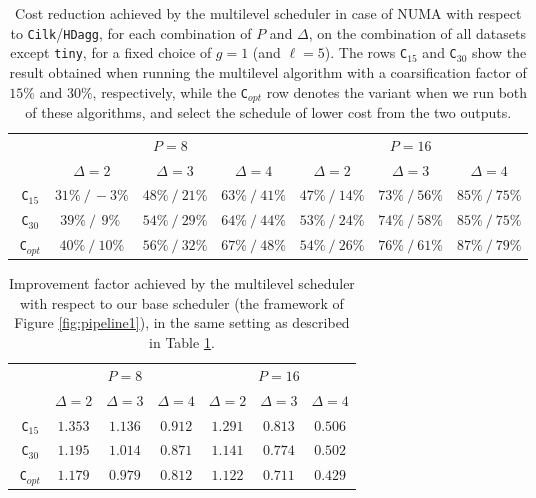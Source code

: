 \documentclass[sigconf,nonacm]{acmart}
\begin{document}
\begin{table*}[t!]
    \centering
      \caption{Cost reduction achieved by the multilevel scheduler in case of NUMA with respect to \texttt{Cilk}/\texttt{HDagg}, for each combination of $P$ and $\Delta$, on the combination of all datasets except \texttt{tiny}, for a fixed choice of $g=1$ (and $\ell=5$). The rows \texttt{C}$_{15}$ and \texttt{C}$_{30}$ show the result obtained when running the multilevel algorithm with a coarsification factor of $15\%$ and $30\%$, respectively, while the \texttt{C}$_{opt}$ row denotes the variant when we run both of these algorithms, and select the schedule of lower cost from the two outputs.}
    \renewcommand{\arraystretch}{1.55}
    \begin{tabular}{c || c | c | c | c | c | c | }
     & \multicolumn{3}{c}{$P=8$} & \multicolumn{3}{c}{$P=16$} \\ [0.5ex]
     & $\Delta=2$ & $\Delta=3$ & $\Delta=4$ & $\Delta=2$ & $\Delta=3$ & $\Delta=4$ \\ [0.5ex] 
     \hline\hline
     $\!$ \texttt{C}$_{15}$  & $31\% \: / \, -3\%$ & $48\% \: / \: 21\%$ & $63\% \: / \: 41\%$ & $47\% \: / \: 14\%$  & $73\% \: / \: 56\%$ & $85\% \: / \: 75\%$ \\ 
     \hline
     $\!$ \texttt{C}$_{30}$ & $39\% \: / \: \, 9\% \:$ & $54\% \: / \: 29\%$ & $64\% \: / \: 44\%$ & $53\% \: / \: 24\%$  & $74\% \: / \: 58\%$ & $85\% \: / \: 75\%$ \\
     \hline
     $\!\!$ \texttt{C}$_{opt}$ & $40\% \: / \: 10\%$ & $56\% \: / \: 32\%$ & $67\% \: / \: 48\%$ & $54\% \: / \: 26\%$  & $76\% \: / \: 61\%$ & $87\% \: / \: 79\%$ \\
     \hline
    \end{tabular}
  \label{tab:ml1}
\end{table*}

\begin{table*}[t!]
    \centering
      \caption{Improvement factor achieved by the multilevel scheduler with respect to our base scheduler (the framework of Figure \ref{fig:pipeline1}), in the same setting as described in Table \ref{tab:ml1}.}
    \renewcommand{\arraystretch}{1.55}
    \begin{tabular}{c || c | c | c | c | c | c | }
     & \multicolumn{3}{c}{$P=8$} & \multicolumn{3}{c}{$P=16$} \\ [0.5ex]
     & $\Delta=2$ & $\Delta=3$ & $\Delta=4$ & $\Delta=2$ & $\Delta=3$ & $\Delta=4$ \\ [0.5ex] 
     \hline\hline
     $\!$ \texttt{C}$_{15}$  & $1.353 $ & $ 1.136 $ & $ 0.912 $ & $ 1.291 $  & $ 0.813 $ & $ 0.506 $ \\ 
     \hline
     $\!$ \texttt{C}$_{30}$ & $1.195 $ & $ 1.014 $ & $ 0.871 $ & $ 1.141 $  & $ 0.774 $ & $ 0.502 $ \\ 
     \hline
     $\!\!$ \texttt{C}$_{opt}$ & $1.179 $ & $ 0.979$ & $ 0.812 $ & $ 1.122 $  & $ 0.711 $ & $ 0.429 $ \\ 
     \hline
    \end{tabular}
  \label{tab:ml2}
\end{table*}
\end{document}
